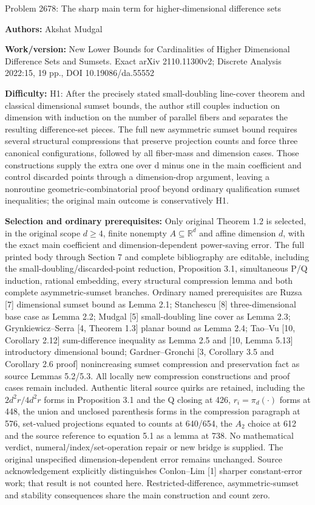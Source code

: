 \documentclass[10pt]{article}
\numberwithin{equation}{section}
\begin{document}
\begin{center}\Large Problem 2678: The sharp main term for higher-dimensional difference sets\end{center}
\noindent\textbf{Authors:} Akshat Mudgal\par
\noindent\textbf{Work/version:} New Lower Bounds for Cardinalities of Higher Dimensional Difference Sets and Sumsets. Exact arXiv 2110.11300v2; Discrete Analysis 2022:15, 19 pp., DOI 10.19086/da.55552\par
\noindent\textbf{Difficulty:} H1: After the precisely stated small-doubling line-cover theorem and classical dimensional sumset bounds, the author still couples induction on dimension with induction on the number of parallel fibers and separates the resulting difference-set pieces. The full new asymmetric sumset bound requires several structural compressions that preserve projection counts and force three canonical configurations, followed by all fiber-mass and dimension cases. Those constructions supply the extra one over d minus one in the main coefficient and control discarded points through a dimension-drop argument, leaving a nonroutine geometric-combinatorial proof beyond ordinary qualification sumset inequalities; the original main outcome is conservatively H1.\par
\noindent\textbf{Selection and ordinary prerequisites:} Only original Theorem 1.2 is selected, in the original scope $d\geq4$, finite nonempty $A\subseteq\mathbb R^d$ and affine dimension $d$, with the exact main coefficient and dimension-dependent power-saving error. The full printed body through Section 7 and complete bibliography are editable, including the small-doubling/discarded-point reduction, Proposition 3.1, simultaneous P/Q induction, rational embedding, every structural compression lemma and both complete asymmetric-sumset branches. Ordinary named prerequisites are Ruzsa [7] dimensional sumset bound as Lemma 2.1; Stanchescu [8] three-dimensional base case as Lemma 2.2; Mudgal [5] small-doubling line cover as Lemma 2.3; Grynkiewicz--Serra [4, Theorem 1.3] planar bound as Lemma 2.4; Tao--Vu [10, Corollary 2.12] sum-difference inequality as Lemma 2.5 and [10, Lemma 5.13] introductory dimensional bound; Gardner--Gronchi [3, Corollary 3.5 and Corollary 2.6 proof] nonincreasing sumset compression and preservation fact as source Lemmas 5.2/5.3. All locally new compression constructions and proof cases remain included. Authentic literal source quirks are retained, including the $2d^2r/4d^2r$ forms in Proposition 3.1 and the Q closing at 426, $r_i=\pi_d(\cdot)$ forms at 448, the union and unclosed parenthesis forms in the compression paragraph at 576, set-valued projections equated to counts at 640/654, the $A_2$ choice at 612 and the source reference to equation 5.1 as a lemma at 738. No mathematical verdict, numeral/index/set-operation repair or new bridge is supplied. The original unspecified dimension-dependent error remains unchanged. Source acknowledgement explicitly distinguishes Conlon--Lim [1] sharper constant-error work; that result is not counted here. Restricted-difference, asymmetric-sumset and stability consequences share the main construction and count zero.\par
\end{document}
